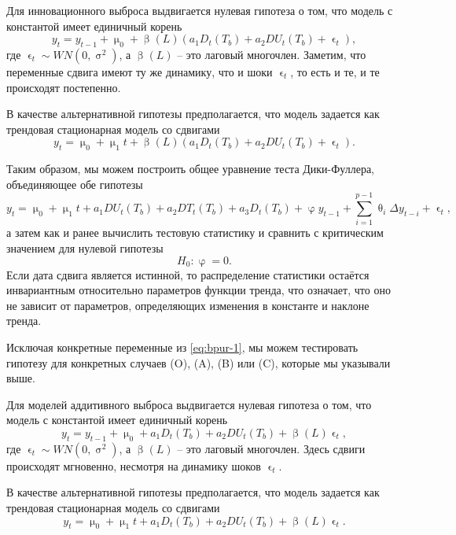 \documentclass[a4paper, 14pt]{extreport}
\numberwithin{equation}{section}
\renewcommand{\beta}{\upbeta}
\renewcommand{\epsilon}{\upvarepsilon}
\renewcommand{\theta}{\uptheta}
\renewcommand{\mu}{\upmu}
\renewcommand{\sigma}{\upsigma}
\renewcommand{\varphi}{\upvarphi}
\numberwithin{equation}{section}
\begin{document}
	Для инновационного выброса выдвигается нулевая гипотеза о том, что модель с константой имеет единичный корень
	\begin{equation}
		y_t = y_{t-1} + \mu_0 + \beta(L)(a_1 D_t(T_b) + a_2 DU_t(T_b) + \epsilon_t),
	\end{equation}
	где $\epsilon_t \sim WN(0,\sigma^2)$, а $\beta(L)$ -- это лаговый многочлен. Заметим, что переменные сдвига имеют ту же динамику, что и шоки $\epsilon_t$, то есть и те, и те происходят постепенно.
	
	В качестве альтернативной гипотезы предполагается, что модель задается как трендовая стационарная модель со сдвигами
	\begin{equation}
		y_t = \mu_0 + \mu_1 t + \beta(L)(a_1 D_t(T_b) + a_2 DU_t(T_b) + \epsilon_t).
	\end{equation}
	
	Таким образом, мы можем построить общее уравнение теста Дики-Фуллера, объединяющее обе гипотезы
	\begin{equation}\label{eq:bpur-1}
		y_t=\mu_0+\mu_1 t+a_1DU_t(T_b)+a_2DT_t(T_b)+a_3D_t(T_b)+\varphi y_{t-1}+\sum\limits_{i=1}^{p-1}\theta_i\Delta y_{t-i}+\epsilon_t,
	\end{equation}
	а затем как и ранее вычислить тестовую статистику и сравнить с критическим значением для нулевой гипотезы $$H_0 : \varphi = 0.$$
	Если дата сдвига является истинной, то распределение статистики остаётся инвариантным относительно параметров функции тренда, что означает, что оно не зависит от параметров, определяющих изменения в константе и наклоне тренда.
	
	Исключая конкретные переменные из \eqref{eq:bpur-1}, мы можем тестировать гипотезу для конкретных случаев (O), (A), (B) или (C), которые мы указывали выше.
	
	Для моделей аддитивного выброса выдвигается нулевая гипотеза о том, что модель с константой имеет единичный корень
	\begin{equation}
		y_t = y_{t-1} + \mu_0 + a_1 D_t(T_b) + a_2 DU_t(T_b) + \beta(L)\epsilon_t,
	\end{equation}
	где $\epsilon_t \sim WN(0,\sigma^2)$, а $\beta(L)$ -- это лаговый многочлен. Здесь сдвиги происходят мгновенно, несмотря на динамику шоков $\epsilon_t$.
	
	В качестве альтернативной гипотезы предполагается, что модель задается как трендовая стационарная модель со сдвигами
	\begin{equation}
		y_t = \mu_0 + \mu_1 t + a_1 D_t(T_b) + a_2 DU_t(T_b) + \beta(L)\epsilon_t.
	\end{equation}
	
\end{document}

